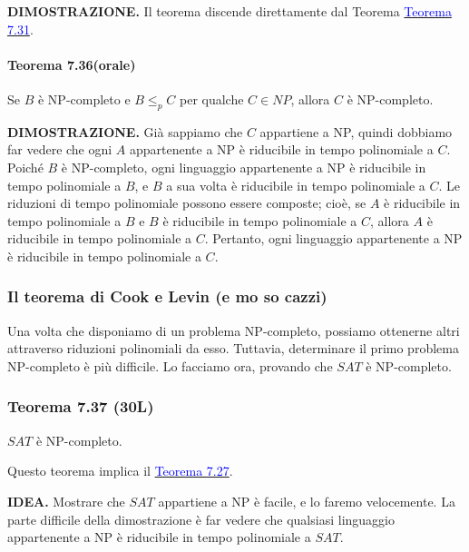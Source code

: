 \documentclass{article}
\begin{document}
\text{}
\newline
\textbf{DIMOSTRAZIONE.}
Il teorema discende direttamente dal Teorema \hyperref[teorema-7.31]{\textcolor{blue}{Teorema 7.31}}.

\paragraph{Teorema 7.36(orale)}
\label{teorema-7.36}
\vspace{1em}
\text{}
\newline
Se $B$ è NP-completo e $B \leq_p C$ per qualche $C \in NP$, allora $C$ è NP-completo.

\text{}
\newline
\textbf{DIMOSTRAZIONE.}
Già sappiamo che $C$ appartiene a NP, quindi dobbiamo far vedere che ogni $A$ appartenente a NP è riducibile in tempo polinomiale a $C$. 
Poiché $B$ è NP-completo, ogni linguaggio appartenente a NP è riducibile in tempo polinomiale a $B$, e $B$ a sua volta è riducibile in tempo polinomiale a $C$. 
Le riduzioni di tempo polinomiale possono essere composte; cioè, se $A$ è riducibile in tempo polinomiale a $B$ e $B$ è riducibile in tempo polinomiale a $C$, allora $A$ è riducibile in tempo polinomiale a $C$. 
Pertanto, ogni linguaggio appartenente a NP è riducibile in tempo polinomiale a $C$.

\subsubsection{Il teorema di Cook e Levin (e mo so cazzi)}
Una volta che disponiamo di un problema NP-completo, possiamo ottenerne altri attraverso riduzioni polinomiali da esso. 
Tuttavia, determinare il primo problema NP-completo è più difficile.
Lo facciamo ora, provando che $SAT$ è NP-completo.

\subsubsection*{Teorema 7.37 (30L)}
\label{teorema-7.37}
$SAT$ è NP-completo.

\text{}
\newline
Questo teorema implica il \hyperref[teorema-7.27]{\textcolor{blue}{Teorema 7.27}}.

\text{}
\newline
\textbf{IDEA.}
Mostrare che $SAT$ appartiene a NP è facile, e lo faremo velocemente. 
La parte difficile della dimostrazione è far vedere che qualsiasi linguaggio appartenente a NP è riducibile in tempo polinomiale a $SAT$.
\end{document}
